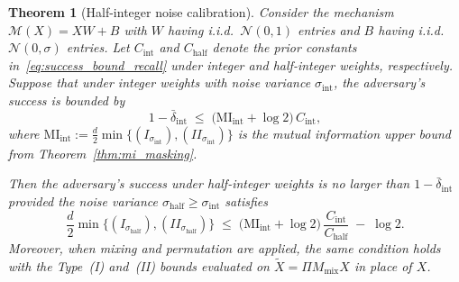 \documentclass[sigconf,anonymous, review]{acmart}
\newcommand{\MI}{\mathrm{MI}}
\newtheorem{theorem}{Theorem}
\begin{document}
\begin{theorem}[Half-integer noise calibration]
\label{thm:half_int_calibration}
Consider the mechanism $\mathcal{M}(X) = XW + B$ with $W$ having i.i.d.\ $\mathcal{N}(0,1)$ entries and $B$ having i.i.d.\ $\mathcal{N}(0,\sigma)$ entries. Let $C_{\mathrm{int}}$ and $C_{\mathrm{half}}$ denote the prior constants in~\eqref{eq:success_bound_recall} under integer and half-integer weights, respectively. Suppose that under integer weights with noise variance $\sigma_{\mathrm{int}}$, the adversary's success is bounded by
\[
1 - \bar{\delta}_{\mathrm{int}}
\;\le\;
\big(\MI_{\mathrm{int}} + \log 2\big)\, C_{\mathrm{int}},
\]
where $\MI_{\mathrm{int}} := \frac{d}{2}\min\{(I_{\sigma_{\mathrm{int}}}),(II_{\sigma_{\mathrm{int}}})\}$ is the mutual information upper bound from Theorem~\ref{thm:mi_masking}.

Then the adversary's success under half-integer weights is no larger than $1 - \bar{\delta}_{\mathrm{int}}$ provided the noise variance $\sigma_{\mathrm{half}} \ge \sigma_{\mathrm{int}}$ satisfies
\begin{equation}
\label{eq:half_calibration}
\frac{d}{2}\min\{(I_{\sigma_{\mathrm{half}}}),(II_{\sigma_{\mathrm{half}}})\}
\;\le\;
\big(\MI_{\mathrm{int}} + \log 2\big)\,\frac{C_{\mathrm{int}}}{C_{\mathrm{half}}}
\;-\; \log 2.
\end{equation}
Moreover, when mixing and permutation are applied, the same condition holds with the Type~(I) and~(II) bounds evaluated on $\tilde{X} = \Pi M_{\mathrm{mix}} X$ in place of $X$.
\end{theorem}
\end{document}
